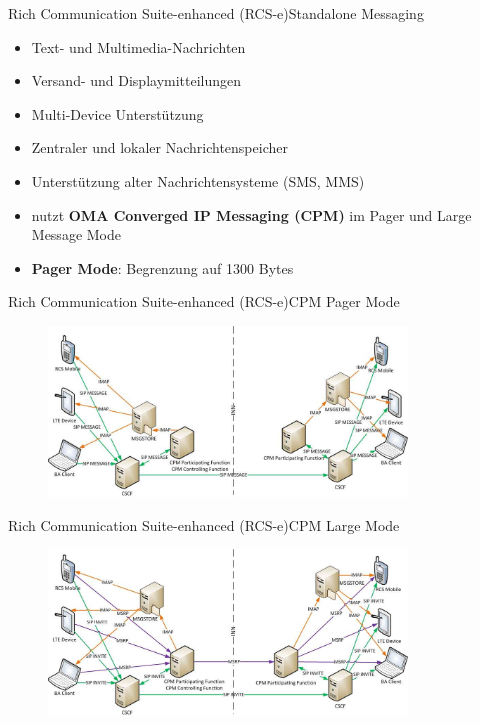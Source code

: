 \documentclass{beamer}
\begin{document}
\begin{frame}{Rich Communication Suite-enhanced (RCS-e)}{Standalone Messaging\cite{rcs:spec}}
	\begin{itemize}
		\item Text- und Multimedia-Nachrichten
		\item Versand- und Displaymitteilungen
		\item Multi-Device Unterstützung
		\item Zentraler und lokaler Nachrichtenspeicher
		\item Unterstützung alter Nachrichtensysteme (SMS, MMS)
		\item nutzt \textbf{OMA Converged IP Messaging (CPM)} im Pager und Large Message Mode
		\item \textbf{Pager Mode}: Begrenzung auf 1300 Bytes
	\end{itemize}
\end{frame}

\begin{frame}{Rich Communication Suite-enhanced (RCS-e)}{CPM Pager Mode\cite{rcs:spec,rcs:cpm,oma:cpm}}
	\begin{figure}[htm]
		\includegraphics[width=0.85\textwidth]{img/rcs-e-pager}
	\end{figure}
\end{frame}

\begin{frame}{Rich Communication Suite-enhanced (RCS-e)}{CPM Large Mode\cite{rcs:spec,rcs:cpm,oma:cpm}}
	\begin{figure}[htm]
		\includegraphics[width=0.85\textwidth]{img/rcs-e-large}
	\end{figure}
\end{frame}
\end{document}
